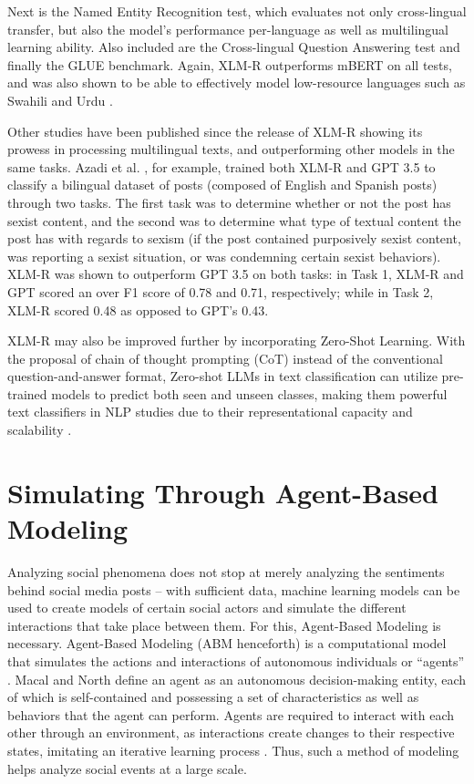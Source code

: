 Next is the Named Entity Recognition test, which evaluates not only cross-lingual transfer, but also the model’s performance per-language as well as multilingual learning ability. Also included are the Cross-lingual Question Answering test and finally the GLUE benchmark. Again, XLM-R outperforms mBERT on all tests, and was also shown to be able to effectively model low-resource languages such as Swahili and Urdu \cite{Conneau-2020}.

Other studies have been published since the release of XLM-R showing its prowess in processing multilingual texts, and outperforming other models in the same tasks. Azadi et al. \cite{Azadi-2025}, for example, trained both XLM-R and GPT 3.5 to classify a bilingual dataset of posts (composed of English and Spanish posts) through two tasks. The first task was to determine whether or not the post has sexist content, and the second was to determine what type of textual content the post has with regards to sexism (if the post contained purposively sexist content, was reporting a sexist situation, or was condemning certain sexist behaviors). XLM-R was shown to outperform GPT 3.5 on both tasks: in Task 1, XLM-R and GPT scored an over F1 score of 0.78 and 0.71, respectively; while in Task 2, XLM-R scored 0.48 as opposed to GPT’s 0.43.

XLM-R may also be improved further by incorporating Zero-Shot Learning.  With the proposal of chain of thought prompting (CoT) instead of the conventional question-and-answer format, Zero-shot LLMs in text classification can utilize pre-trained models to predict both seen and unseen classes, making them powerful text classifiers in NLP studies due to their representational capacity and scalability \cite{Wang-2023,Zhang-2025}.

\section{Simulating Through Agent-Based Modeling}
Analyzing social phenomena does not stop at merely analyzing the sentiments behind social media posts – with sufficient data, machine learning models can be used to create models of certain social actors and simulate the different interactions that take place between them. For this, Agent-Based Modeling is necessary. Agent-Based Modeling (ABM henceforth) is a computational model that simulates the actions and interactions of autonomous individuals or “agents” \cite{Macal-2009}. Macal and North \cite{Macal-2009} define an agent as an autonomous decision-making entity, each of which is self-contained and possessing a set of characteristics as well as behaviors that the agent can perform. Agents are required to interact with each other through an environment, as interactions create changes to their respective states, imitating an iterative learning process \cite{Macal-2009}. Thus, such a method of modeling helps analyze social events at a large scale.

